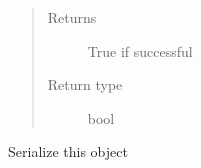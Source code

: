 \documentclass[letterpaper,10pt,english]{sphinxmanual}
\begin{document}
\begin{fulllineitems}
\begin{fulllineitems}
\begin{quote}
\begin{description}
\item[{Returns}] \leavevmode
True if successful

\item[{Return type}] \leavevmode
bool

\end{description}\end{quote}

\end{fulllineitems}


\begin{fulllineitems}
\label{\detokenize{bbc1.core.bbclib:bbc1.core.bbclib.BBcWitness.serialize}}
Serialize this object

\end{fulllineitems}


\end{fulllineitems}

\end{document}
